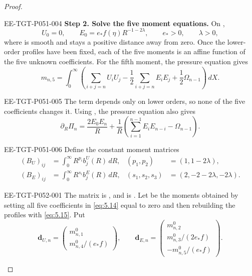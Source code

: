 \begin{proof}
\begin{EESegment}{EE-TGT-P051-004}
\textbf{Step 2. Solve the five moment equations.}
On ,
\[
U_0=0,
\qquad
E_0=e_*f(\eta)R^{-1-2\lambda},
\qquad
e_*>0,
\qquad
\lambda>0,
\]
where  is smooth and stays a positive distance away from zero. Once the lower-order profiles have
been fixed, each of the five moments is an affine function of the five unknown coefficients. For the fifth moment, the
pressure equation gives
\[
m_{n,5}=\int_0^\infty\left(
\sum_{i+j=n}U_iU_j
-\frac12\sum_{i+j=n}E_iE_j
+\frac12\Omega_{n-1}
\right)\,dX.
\]
\end{EESegment}

\begin{EESegment}{EE-TGT-P051-005}
The term  depends only on lower orders, so none of the five coefficients changes it.
Using , the pressure equation also gives
\[
\partial_R\Pi_n
=\frac{2E_0E_n}{R}
+\frac1R\left(\sum_{i=1}^{n-1}E_iE_{n-i}-\Omega_{n-1}\right).
\]
\end{EESegment}

\begin{EESegment}{EE-TGT-P051-006}
Define the constant moment matrices
\[
\begin{aligned}
(B_U)_{ij}&=\int_0^\infty R^{p_i}b_j^U(R)\,dR,
& (p_1,p_2)&=(1,1-2\lambda),\\
(B_E)_{ij}&=\int_0^\infty R^{s_i}b_j^E(R)\,dR,
& (s_1,s_2,s_3)&=(2,-2-2\lambda,-2\lambda).
\end{aligned}
\]
\end{EESegment}

%
\begin{EESegment}{EE-TGT-P052-001}
The matrix  is , and
 is . Let  be the moments obtained
by setting all five coefficients in \eqref{eq:5.14} equal to zero and then rebuilding the profiles with \eqref{eq:5.15}.
Put
\[
\mathbf d_{U,n}
=\begin{pmatrix}
m_{n,1}^0\\[2pt]
m_{n,4}^0/(e_*f)
\end{pmatrix},
\qquad
\mathbf d_{E,n}
=\begin{pmatrix}
m_{n,2}^0\\[2pt]
m_{n,3}^0/(2e_*f)\\[2pt]
-m_{n,5}^0/(e_*f)
\end{pmatrix}.
\]
\end{EESegment}


\end{proof}
